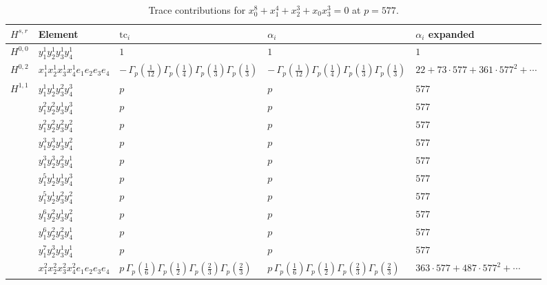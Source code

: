 \documentclass[11pt]{article}
\begin{document}
\begin{table}[ht]
\centering
\caption{Trace contributions for $x_0^{8} + x_1^{4} + x_2^{3} + x_0 x_3^{3} = 0$ at $p=577$.}\label{tab:deformed-66}
\renewcommand{\arraystretch}{1.1}
{\scriptsize
\begin{tabular}{@{}lllll@{}}
\toprule
$H^{s,r}$ & Element & $\mathrm{tc}_i$ & $\alpha_i$ & $\alpha_i$ expanded \\
\midrule
$H^{0,0}$ & $y_{1}^{1} y_{2}^{1} y_{3}^{1} y_{4}^{1}$ & $1$ & $1$ & $1$ \\
\midrule
$H^{0,2}$ & $x_{1}^{1} x_{2}^{1} x_{3}^{1} x_{4}^{1}  e_{1} e_{2} e_{3} e_{4}$ & $- \, \Gamma_p \left( \frac{1}{12} \right) \Gamma_p \left( \frac{1}{4} \right) \Gamma_p \left( \frac{1}{3} \right) \Gamma_p \left( \frac{1}{3} \right)$ & $- \, \Gamma_p \left( \frac{1}{12} \right) \Gamma_p \left( \frac{1}{4} \right) \Gamma_p \left( \frac{1}{3} \right) \Gamma_p \left( \frac{1}{3} \right)$ & $22{+}73{\cdot}577{+}361{\cdot}577^{2}{+}\cdots$ \\
\midrule
$H^{1,1}$ & $y_{1}^{1} y_{2}^{1} y_{3}^{2} y_{4}^{3}$ & $p \,$ & $p \,$ & $577$ \\
 & $y_{1}^{2} y_{2}^{2} y_{3}^{1} y_{4}^{3}$ & $p \,$ & $p \,$ & $577$ \\
 & $y_{1}^{2} y_{2}^{2} y_{3}^{2} y_{4}^{2}$ & $p \,$ & $p \,$ & $577$ \\
 & $y_{1}^{3} y_{2}^{3} y_{3}^{1} y_{4}^{2}$ & $p \,$ & $p \,$ & $577$ \\
 & $y_{1}^{3} y_{2}^{3} y_{3}^{2} y_{4}^{1}$ & $p \,$ & $p \,$ & $577$ \\
 & $y_{1}^{5} y_{2}^{1} y_{3}^{1} y_{4}^{3}$ & $p \,$ & $p \,$ & $577$ \\
 & $y_{1}^{5} y_{2}^{1} y_{3}^{2} y_{4}^{2}$ & $p \,$ & $p \,$ & $577$ \\
 & $y_{1}^{6} y_{2}^{2} y_{3}^{1} y_{4}^{2}$ & $p \,$ & $p \,$ & $577$ \\
 & $y_{1}^{6} y_{2}^{2} y_{3}^{2} y_{4}^{1}$ & $p \,$ & $p \,$ & $577$ \\
 & $y_{1}^{7} y_{2}^{3} y_{3}^{1} y_{4}^{1}$ & $p \,$ & $p \,$ & $577$ \\
 & $x_{1}^{2} x_{2}^{2} x_{3}^{2} x_{4}^{2}  e_{1} e_{2} e_{3} e_{4}$ & $p \, \Gamma_p \left( \frac{1}{6} \right) \Gamma_p \left( \frac{1}{2} \right) \Gamma_p \left( \frac{2}{3} \right) \Gamma_p \left( \frac{2}{3} \right)$ & $p \, \Gamma_p \left( \frac{1}{6} \right) \Gamma_p \left( \frac{1}{2} \right) \Gamma_p \left( \frac{2}{3} \right) \Gamma_p \left( \frac{2}{3} \right)$ & $363{\cdot}577{+}487{\cdot}577^{2}{+}\cdots$ \\

\end{tabular}}
\end{table}
\end{document}
